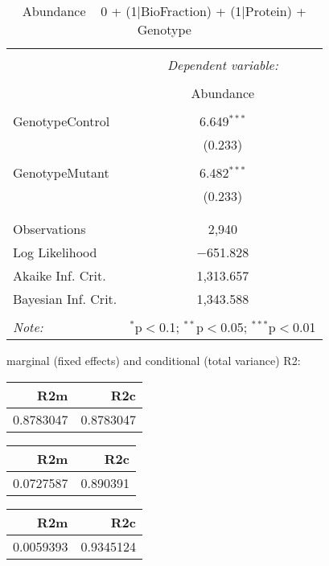 \documentclass[11pt]{report}
\begin{document}
\begin{table}[!htbp] \centering 
  \caption{Abundance ~ 0 + (1|BioFraction) + (1|Protein) + Genotype} 
  \label{} 
\begin{tabular}{@{\extracolsep{5pt}}lc} 
\\[-1.8ex]\hline 
\hline \\[-1.8ex] 
 & \multicolumn{1}{c}{\textit{Dependent variable:}} \\ 
\cline{2-2} 
\\[-1.8ex] & Abundance \\ 
\hline \\[-1.8ex] 
 GenotypeControl & 6.649$^{***}$ \\ 
  & (0.233) \\ 
  & \\ 
 GenotypeMutant & 6.482$^{***}$ \\ 
  & (0.233) \\ 
  & \\ 
\hline \\[-1.8ex] 
Observations & 2,940 \\ 
Log Likelihood & $-$651.828 \\ 
Akaike Inf. Crit. & 1,313.657 \\ 
Bayesian Inf. Crit. & 1,343.588 \\ 
\hline 
\hline \\[-1.8ex] 
\textit{Note:}  & \multicolumn{1}{r}{$^{*}$p$<$0.1; $^{**}$p$<$0.05; $^{***}$p$<$0.01} \\ 
\end{tabular} 
\end{table} 
marginal (fixed effects) and conditional (total variance) R2:

\begin{tabular}{r|r}
\hline
R2m & R2c\\
\hline
0.8783047 & 0.8783047\\
\hline
\end{tabular}

\begin{tabular}{r|r}
\hline
R2m & R2c\\
\hline
0.0727587 & 0.890391\\
\hline
\end{tabular}

\begin{tabular}{r|r}
\hline
R2m & R2c\\
\hline
0.0059393 & 0.9345124\\
\hline
\end{tabular}
\end{document}
